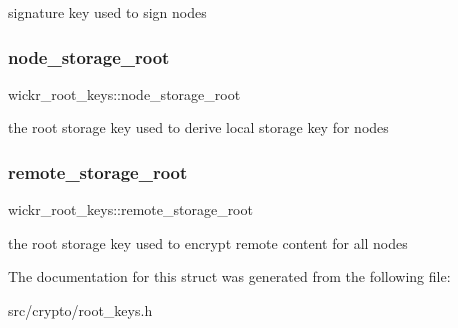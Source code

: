 signature key used to sign nodes \mbox{\label{structwickr__root__keys_ada908a5fa4aaf7c8b9a4b496c99e595a}} 
\subsubsection{\texorpdfstring{node\+\_\+storage\+\_\+root}{node\_storage\_root}}
{\footnotesize\ttfamily wickr\+\_\+root\+\_\+keys\+::node\+\_\+storage\+\_\+root}

the root storage key used to derive local storage key for nodes \mbox{\label{structwickr__root__keys_a9bf1ff10b669493393e2bf918f5d4090}} 
\subsubsection{\texorpdfstring{remote\+\_\+storage\+\_\+root}{remote\_storage\_root}}
{\footnotesize\ttfamily wickr\+\_\+root\+\_\+keys\+::remote\+\_\+storage\+\_\+root}

the root storage key used to encrypt remote content for all nodes 

The documentation for this struct was generated from the following file\+:\begin{DoxyCompactItemize}
\item 
src/crypto/root\+\_\+keys.\+h\end{DoxyCompactItemize}
